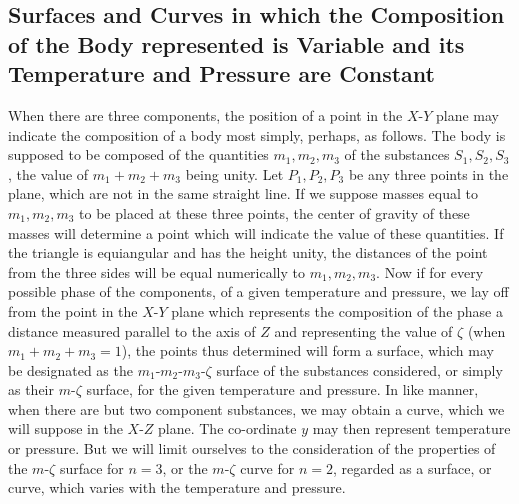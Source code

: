 \documentclass[11pt]{article}
\begin{document}
\subsection*{Surfaces and Curves in which the Composition of the Body represented is Variable and its Temperature and Pressure are Constant}

When there are three components, the position of a point in the $X$-$Y$ plane may indicate the composition of a body most simply, perhaps, as follows. The body is supposed to be composed of the quantities $m_1,m_2,m_3$ of the substances $S_1,S_2,S_3$, the value of $m_1+m_2+m_3$ being unity. Let $P_1,P_2,P_3$ be any three points in the plane, which are not in the same straight line. If we suppose masses equal to $m_1,m_2,m_3$ to be placed at these three points, the center of gravity of these masses will determine a point which will indicate the value of these quantities. If the triangle is equiangular and has the height unity, the distances of the point from the three sides will be equal numerically to $m_1,m_2,m_3$. Now if for every possible phase of the components, of a given temperature and pressure, we lay off from the point in the $X$-$Y$ plane which represents the composition of the phase a distance measured parallel to the axis of $Z$ and representing the value of $\zeta$ (when $m_1+m_2+m_3=1$), the points thus determined will form a surface, which may be designated as the $m_1$-$m_2$-$m_3$-$\zeta$ surface of the substances considered, or simply as their $m$-$\zeta$ surface, for the given temperature and pressure. In like manner, when there are but two component substances, we may obtain a curve, which we will suppose in the $X$-$Z$ plane. The co-ordinate $y$ may then represent temperature or pressure. But we will limit ourselves to the consideration of the properties of the $m$-$\zeta$ surface for $n=3$, or the $m$-$\zeta$ curve for $n=2$, regarded as a surface, or curve, which varies with the temperature and pressure.
\end{document}
